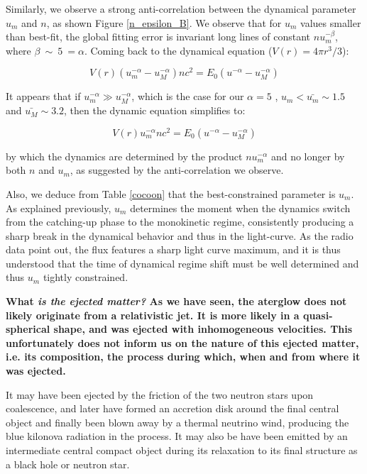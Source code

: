 Similarly, we observe a strong anti-correlation between the dynamical parameter $u_m$ and $n$, as shown Figure \ref{n_epsilon_B}. We observe that for $u_m$ values smaller than best-fit, the global fitting error is invariant long lines of constant $nu_m^{-\beta}$, where $\beta~\sim~5~=\alpha$. Coming back to the dynamical equation ($V(r) = 4\pi r^3/3$):

\begin{equation}V(r)(u_m^{-\alpha} - u_M^{-\alpha}) n c ^ 2= E_0 (u^{-\alpha} - u_M^{-\alpha}) \end{equation}

It appears that if $u_m^{-\alpha} \gg u_M^{-\alpha}$, which is the case for our $\alpha = 5$ , $u_m < \bar{u_m} \sim 1.5$ and $\bar{u_M} \sim 3.2$, then the dynamic equation simplifies to:

\begin{equation}V(r) u_m^{-\alpha} nc^2 = E_0 (u^{-\alpha} - u_M^{-\alpha}) \end{equation}

by which the dynamics are determined by the product $n u_m^{-\alpha}$ and no longer by both $n$ and $u_m$, as suggested by the anti-correlation we observe.

Also, we deduce from Table \ref{cocoon} that the best-constrained parameter is $u_m$. As explained previously, $u_m$ determines the moment when the dynamics switch from the catching-up phase to the monokinetic regime, consistently producing a sharp break in the dynamical behavior and thus in the light-curve. As the radio data point out, the flux features a sharp light curve maximum, and it is thus understood that the time of dynamical regime shift must be well determined and thus $u_m$ tightly constrained.

\bf{What \it{is} the ejected matter? }As we have seen, the aterglow does not likely originate from a relativistic jet. It is more likely in a quasi-spherical shape, and was ejected with inhomogeneous velocities. This unfortunately does not inform us on the nature of this ejected matter, i.e. its composition, the process during which, when and from where it was ejected.

It may have been ejected by the friction of the two neutron stars upon coalescence, and later have formed an accretion disk around the final central object and finally been blown away by a thermal neutrino wind, producing the blue kilonova radiation in the process. It may also be have been emitted by an intermediate central compact object during its relaxation to its final structure as a black hole or neutron star.

